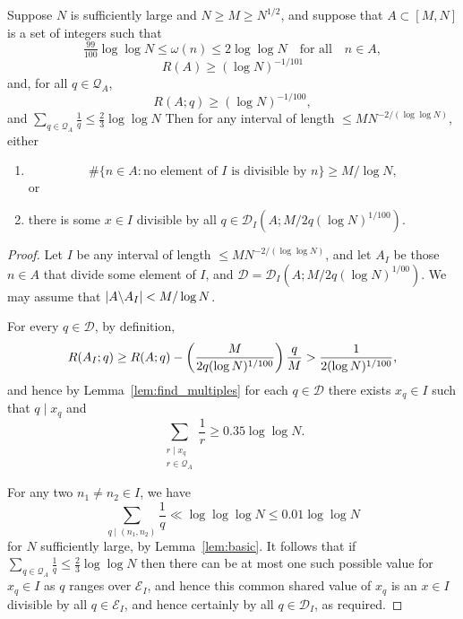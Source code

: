 \begin{proposition}\label{prop:tech_iterative2}
Suppose $N$ is sufficiently large and $N\geq M\geq N^{1/2}$, and suppose that $A\subset [M,N]$ is a set of integers such that
\[\tfrac{99}{100}\log\log N\leq \omega(n)\leq  2\log\log N\quad\textrm{for all}\quad n\in A,\]
\[R(A)\geq (\log N)^{-1/101}\]
and, for all $q\in \mathcal{Q}_A$,
\[R(A;q) \geq (\log N)^{-1/100},\]
and $\sum_{q\in\mathcal{Q}_A}\frac{1}{q}\leq \frac{2}{3}\log\log N$  
Then for any interval of length $\leq MN^{-2/(\log \log N)}$, either
\begin{enumerate}
\item \[\# \{ n\in A : \textrm{no element of }I\textrm{ is divisible by }n\}\geq M/\log N,\]
or
\item there is some $x\in I$ divisible by all $q\in\mathcal{D}_I(A;M/2q(\log N)^{1/100})$.
\end{enumerate}
\end{proposition}
\begin{proof}
 
Let $I$ be any interval of length $\leq MN^{-2/(\log\log N)}$, and let $A_I$ be those $n\in A$ that divide some element of $I$, and $\mathcal{D}=\mathcal{D}_I(A;M/2q(\log N)^{1/00})$. We may assume that $\left\lvert A\backslash A_I\right\rvert< M/\log N$.

For every $q\in \mathcal{D}$, by definition,
  \[R(A_I; q) \geq R(A;q) - \left( \frac{M}{2q(\log N)^{1/100}}\right)\frac{q}{M}>\frac{1}{2(\log N)^{1/100}},\]
and hence by Lemma~\ref{lem:find_multiples} for each $q\in\mathcal{D}$ there exists $x_q\in I$ such that $q\mid x_q$ and 
\[\sum_{\substack{r\mid x_q\\ r\in \mathcal{Q}_A}}\frac{1}{r}\geq 0.35\log\log N.\] 

 For any two $n_1\neq n_2\in I$, we have
  \[\sum_{q\mid (n_1,n_2)}\frac{1}{q}\ll \log\log\log N\leq 0.01\log\log N\]
  for $N$ sufficiently large, by Lemma~\ref{lem:basic}.  It follows that if $\sum_{q\in\mathcal{Q}_A}\frac{1}{q}\leq \frac{2}{3}\log\log N$ then there can be at most one such possible value for $x_q\in I$ as $q$ ranges over $\mathcal{E}_I$, and hence this common shared value of $x_q$ is an $x\in I$ divisible by all $q\in\mathcal{E}_I$, and hence certainly by all $q\in\mathcal{D}_I$, as required.
  \end{proof}

